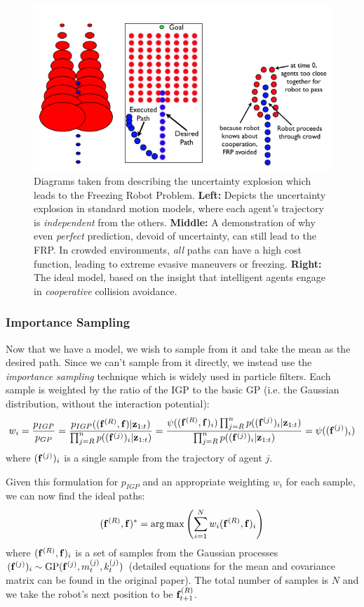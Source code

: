 \documentclass[a4paper,11pt,headings=small]{article}
\DeclareMathOperator*{\argmax}{arg\,max}
\begin{document}
\begin{figure}[h]
\centering
\includegraphics[width=.75\textwidth]{uncertainty-explosion.png}
\caption{Diagrams taken from \cite{Trautman2010} describing the uncertainty explosion which leads to the Freezing Robot Problem. \textbf{Left:} Depicts the uncertainty explosion in standard motion models, where each agent's trajectory is \emph{independent} from the others. \textbf{Middle:} A demonstration of why even \emph{perfect} prediction, devoid of uncertainty, can still lead to the FRP. In crowded environments, \emph{all} paths can have a high cost function, leading to extreme evasive maneuvers or freezing. \textbf{Right:} The ideal model, based on the insight that intelligent agents engage in \emph{cooperative} collision avoidance.}
\label{uncertainty}
\end{figure}

\subsubsection*{Importance Sampling}
\quad Now that we have a model, we wish to sample from it and take the mean as the desired path. Since we can't sample from it directly, we instead use the \emph{importance sampling} technique which is widely used in particle filters. Each sample is weighted by the ratio of the IGP to the basic GP (i.e. the Gaussian distribution, without the interaction potential):
$$ w_i = \frac{p_{IGP}}{p_{GP}} = \frac{p_{IGP}((\mathbf{f}^{(R)},\mathbf{f}) | \mathbf{z}_{1:t})}{\prod_{j=R}^n p((\mathbf{f}^{(j)})_i | \mathbf{z}_{1:t})} = \frac{\psi((\mathbf{f}^{(R)},\mathbf{f})_i) \prod_{j=R}^n p((\mathbf{f}^{(j)})_i | \mathbf{z}_{1:t})}{\prod_{j=R}^n p((\mathbf{f}^{(j)})_i | \mathbf{z}_{1:t})} = \psi((\mathbf{f}^{(j)})_i)$$
where $(\mathbf{f}^{(j)})_i$ is a single sample from the trajectory of agent $j$.

Given this formulation for $p_{IGP}$ and an appropriate weighting $w_i$ for each sample, we can now find the ideal paths:
$$ (\fr,\f)^* = \argmax\left( \sum_{i=1}^N w_i(\fr,\f)_i \right) $$
where $(\mathbf{f}^{(R)},\mathbf{f})_i$ is a set of samples from the Gaussian processes $(\mathbf{f}^{(j)})_i \sim \textrm{GP}(\mathbf{f}^{(j)}, m_t^{(j)}, k_t^{(j)})$ (detailed equations for the mean and covariance matrix can be found in the original paper). The total number of samples is $N$ and we take the robot's next position to be $\mathbf{f}^{(R)}_{t+1}$.
\end{document}
